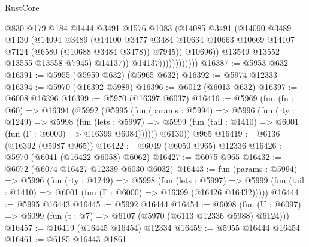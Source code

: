 \begin{lexlean}{RustCore}
\begin{coremodule}
                                  @830
                                  @179
                                  @184
                                  @1444
                                  @3491
                                  @1576
                                  @1083
                                  (@14085
                                    @3491
                                    (@14090
                                      @3489
                                      @1430
                                      (@14094
                                        @3489
                                        (@14100
                                          @3477
                                          @3484
                                          @10634
                                          @10663
                                          @10669
                                          @14107
                                          @7124
                                          (@6580 (@10688 @3484 @3478))
                                          @7945))
                                      @10696))
                                  @13549
                                  @13552
                                  @13555
                                  @13558
                                  @7945)
                                @14137))
                            @14137))))))))))))
@16387 := @5953 @632
@16391 := @5955 (@5959 @632) (@5965 @632)
@16392 := @5974 @12333
@16394 := @5970 (@16392 @5989)
@16396 := @6012 (@6013 @632)
@16397 := @6008 @16396
@16399 := @5970 (@16397 @6037)
@16416 := @5969
    (fun (fn : @60) =>
    @16394
      (@5992
        (@5995
          (fun (params : @5994) =>
          @5996
            (fun (rty : @1249) =>
            @5998
              (fun (lets : @5997) =>
              @5999 (fun (tail : @1410) => @6001 (fun (Γ : @6000) => @16399 @6084))))))
        @6130))
    @965
@16419 := @6136 (@16392 (@5987 @965))
@16422 := @6049 (@6050 @965) @12336
@16426 := @5970 (@6041 (@16422 @6058) @6062)
@16427 := @6075 @965
@16432 := @6072 (@6074 @16427 @12339 @6030 @6032)
@16443 := fun (params : @5994) =>
  @5996
    (fun (rty : @1249) =>
    @5998
      (fun (lets : @5997) =>
      @5999 (fun (tail : @1410) => @6001 (fun (Γ : @6000) => @16399 (@16426 @16432)))))
@16444 := @5995 @16443
@16445 := @5992 @16444
@16454 := @6098
    (fun (U : @6097) => @6099 (fun (t : @7) => @6107 (@5970 (@6113 @12336 @5988) @6124)))
@16457 := @16419 (@16445 @16454) @12334
@16459 := @5955 @16444 @16454
@16461 := @6185 @16443 @1861

\end{coremodule}
\end{lexlean}
